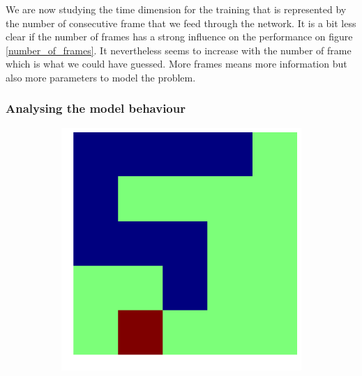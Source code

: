 \documentclass{article}
\begin{document}
We are now studying the time dimension for the training that is represented by the number of consecutive frame that we feed through the network.
It is a bit less clear if the number of frames has a strong influence on the performance on figure \ref{number_of_frames}.
It nevertheless seems to increase with the number of frame which is what we could have guessed. More frames means more information but also more parameters to model the problem.

\subsubsection*{Analysing the model behaviour}

\begin{figure}[!htpb]
\centering
  \begin{subfigure}[b]{.19\linewidth}
    \includegraphics[width=\linewidth]{snake_61.png}
  \end{subfigure}
  \begin{subfigure}[b]{.19\linewidth}

\end{subfigure}
\end{figure}
\end{document}
